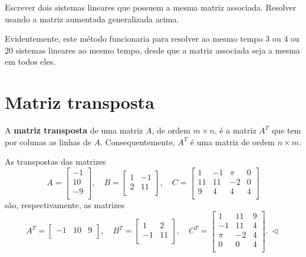 \documentclass[../livro.tex]{subfiles}  %
\begin{document}
\begin{exercise}
	Escrever dois sistemas lineares que possuem a mesma matriz associada. Resolver usando a matriz aumentada generalizada acima.
\end{exercise}

Evidentemente, este método funcionaria para resolver ao mesmo tempo 3 ou 4 ou 20 sistemas lineares ao mesmo tempo, desde que a matriz associada seja a mesma em todos eles.



\section{Matriz transposta}


A \textbf{matriz transposta} de uma matriz $A$, de ordem $m\times n$, é a matriz $A^T$ que tem por colunas as linhas de $A$. Consequentemente, $A^T$ é uma matriz de ordem $n \times m$.

\begin{example}
	As transpostas das matrizes
	\[
	A = \left[
	\begin{array}{c}
	-1  \\
	10  \\
	-9  \\
	\end{array}
	\right], \quad
	B = \left[
	\begin{array}{cc}
	1 & -1  \\
	2 & 11 \\
	\end{array}
	\right], \quad
	C = \left[
	\begin{array}{cccc}
	1  & -1 & \pi & 0 \\
	11 & 11 & -2  & 0 \\
	9  & 4  & 4   & 4 \\
	\end{array}
	\right]
	\] são, respectivamente, as matrizes
	\[
	A^T = \left[
	\begin{array}{ccc}
	-1 & 10 & 9  \\
	\end{array}
	\right], \quad
	B^T = \left[
	\begin{array}{cc}
	1  & 2  \\
	-1 & 11 \\
	\end{array}
	\right], \quad
	C^T = \left[
	\begin{array}{ccc}
	1   & 11 & 9 \\
	-1  & 11 & 4 \\
	\pi & -2 & 4 \\
	0  & 0  & 4 \\
	\end{array}
	\right]. \ \lhd
	\]
\end{example}
\end{document}

